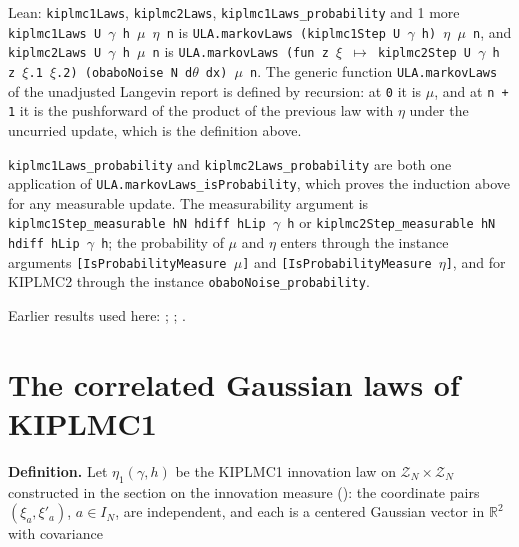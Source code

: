 \documentclass[11pt,a4paper]{article}
\begin{document}
\begin{leanbox}{Lean: \texttt{kiplmc1Laws}, \texttt{kiplmc2Laws}, \texttt{kiplmc1Laws\_\allowbreak{}probability} and 1 more}
\texttt{kiplmc1\allowbreak{}Laws U \ensuremath{\gamma} h \ensuremath{\mu} \ensuremath{\eta} n} is \texttt{ULA.\allowbreak{}markov\allowbreak{}Laws (kiplmc1\allowbreak{}Step U \ensuremath{\gamma} h) \ensuremath{\eta} \ensuremath{\mu} n}, and \texttt{kiplmc2\allowbreak{}Laws U \ensuremath{\gamma} h \ensuremath{\mu} n} is \texttt{ULA.\allowbreak{}markov\allowbreak{}Laws (fun z \ensuremath{\xi} \ensuremath{\mapsto} kiplmc2\allowbreak{}Step U \ensuremath{\gamma} h z \ensuremath{\xi}.\allowbreak{}1 \ensuremath{\xi}.\allowbreak{}2) (obabo\allowbreak{}Noise N d\ensuremath{\theta} dx) \ensuremath{\mu} n}. The generic function \texttt{ULA.\allowbreak{}markov\allowbreak{}Laws} of the unadjusted Langevin report is defined by recursion: at \texttt{0} it is \texttt{\ensuremath{\mu}}, and at \texttt{n + 1} it is the pushforward of the product of the previous law with \texttt{\ensuremath{\eta}} under the uncurried update, which is the definition above.




\texttt{kiplmc1\allowbreak{}Laws\_\allowbreak{}probability} and \texttt{kiplmc2\allowbreak{}Laws\_\allowbreak{}probability} are both one application of \texttt{ULA.\allowbreak{}markov\allowbreak{}Laws\_\allowbreak{}is\allowbreak{}Probability}, which proves the induction above for any measurable update. The measurability argument is \texttt{kiplmc1\allowbreak{}Step\_\allowbreak{}measurable h\allowbreak{}N hdiff h\allowbreak{}Lip \ensuremath{\gamma} h} or \texttt{kiplmc2\allowbreak{}Step\_\allowbreak{}measurable h\allowbreak{}N hdiff h\allowbreak{}Lip \ensuremath{\gamma} h}; the probability of \texttt{\ensuremath{\mu}} and \texttt{\ensuremath{\eta}} enters through the instance arguments \texttt{[Is\allowbreak{}Probability\allowbreak{}Measure \ensuremath{\mu}]} and \texttt{[Is\allowbreak{}Probability\allowbreak{}Measure \ensuremath{\eta}]}, and for KIPLMC2 through the instance \texttt{obabo\allowbreak{}Noise\_\allowbreak{}probability}.
\end{leanbox}


Earlier results used here: \cite[Section~3.33.11]{LangevinLean2026ULASC}; \cite[Section~3.33.6]{LangevinLean2026ULASC}; \cite[Section~3.1.1]{LangevinLean2026IPLA}.

\section{\texorpdfstring{The correlated Gaussian laws of KIPLMC1}{The correlated Gaussian laws of KIPLMC1}}


\textbf{Definition.} Let \(\eta_1(\gamma,h)\) be the KIPLMC1 innovation law on \(\mathcal Z_N\times\mathcal Z_N\) constructed in the section on the innovation measure (\cite[Section~3.6.2]{LangevinLean2026KIPLMC}): the coordinate pairs \((\xi_a,\xi'_a)\), \(a\in I_N\), are independent, and each is a centered Gaussian vector in \(\mathbb R^2\) with covariance
\end{document}
